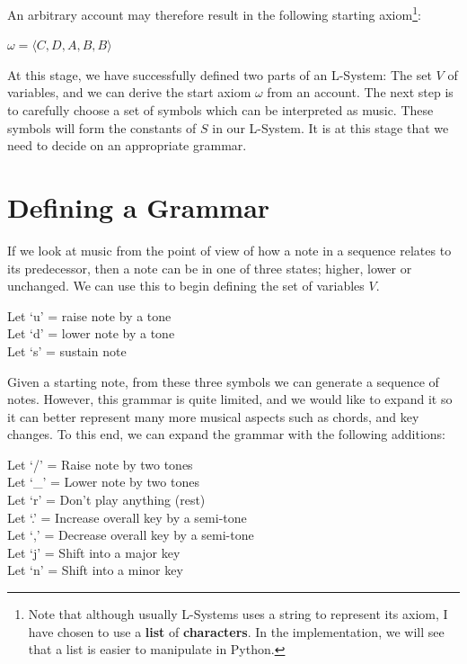 \noindent An arbitrary account may therefore result in the following starting axiom\footnote{Note that although usually L-Systems uses a string to represent its axiom, I have chosen to use a \textbf{list} of \textbf{characters}. In the implementation, we will see that a list is easier to manipulate in Python.}:

\begin{singlespace}
\begin{formality}
$\omega = \langle C, D, A, B, B \rangle$
\end{formality}
\end{singlespace}

At this stage, we have successfully defined two parts of an L-System: The set $V$ of variables, and we can derive the start axiom $\omega$ from an account. The next step is to carefully choose a set of symbols which can be interpreted as music. These symbols will form the constants of $S$ in our L-System. It is at this stage that we need to decide on an appropriate grammar.

\section{Defining a Grammar}

If we look at music from the point of view of how a note in a sequence relates to its predecessor, then a note can be in one of three states; higher, lower or unchanged. We can use this to begin defining the set of variables $V$.

\begin{singlespace}
\begin{formality}
Let `u' = raise note by a tone\\
Let `d' = lower note by a tone\\
Let `s' = sustain note
\end{formality}
\end{singlespace}

Given a starting note, from these three symbols we can generate a sequence of notes. However, this grammar is quite limited, and we would like to expand it so it can better represent many more musical aspects such as chords, and key changes. To this end, we can expand the grammar with the following additions:

\begin{singlespace}
\begin{formality}
Let `/' = Raise note by two tones\\
Let `\_' = Lower note by two tones\\
Let `r' = Don't play anything (rest)\\
Let `.' = Increase overall key by a semi-tone\\
Let `,' = Decrease overall key by a semi-tone\\
Let `j' = Shift into a major key\\
Let `n' = Shift into a minor key
\end{formality}
\end{singlespace}

